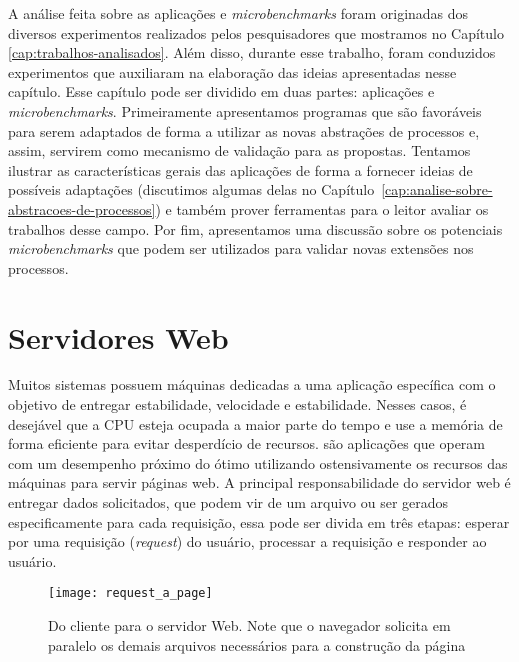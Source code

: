 A análise feita sobre as aplicações e \emph{microbenchmarks} foram originadas
dos diversos experimentos realizados pelos pesquisadores que mostramos no
Capítulo \ref{cap:trabalhos-analisados}. Além disso, durante esse trabalho,
foram conduzidos experimentos que auxiliaram na elaboração das ideias
apresentadas nesse capítulo. Esse capítulo pode ser dividido em duas partes:
aplicações e \emph{microbenchmarks}. Primeiramente apresentamos programas que
são favoráveis para serem adaptados de forma a utilizar as novas abstrações
de processos e, assim, servirem como mecanismo de validação para as propostas.
Tentamos ilustrar as características gerais das aplicações de forma a fornecer
ideias de possíveis adaptações (discutimos algumas delas
no Capítulo~\ref{cap:analise-sobre-abstracoes-de-processos}) e também prover
ferramentas para o leitor avaliar os trabalhos desse campo. Por fim,
apresentamos uma discussão sobre os potenciais \emph{microbenchmarks} que podem
ser utilizados para validar novas extensões nos processos.


\section{Servidores Web}
\label{sec:web_server}

Muitos sistemas possuem máquinas dedicadas a uma aplicação específica com o
objetivo de entregar estabilidade, velocidade e estabilidade. Nesses casos, é
desejável que a CPU esteja ocupada a maior parte do tempo e use a memória de
forma eficiente para evitar desperdício de recursos.  são aplicações que operam com um desempenho próximo
do ótimo utilizando ostensivamente os recursos das máquinas para servir páginas
web. A principal responsabilidade do servidor web é entregar dados solicitados,
que podem vir de um arquivo ou ser gerados especificamente para cada
requisição, essa pode ser divida em três etapas: esperar por uma requisição
(\emph{request}) do usuário, processar a requisição e responder ao usuário.

\begin{figure}[!h]
  \centering
  \texttt{[image: request\_a\_page]}
  \caption[Do cliente para o servidor Web.]{Do cliente para o servidor Web. Note que o navegador solicita em paralelo os demais arquivos necessários para a construção da página}
  \label{fig:client_to_web_server}
\end{figure}

